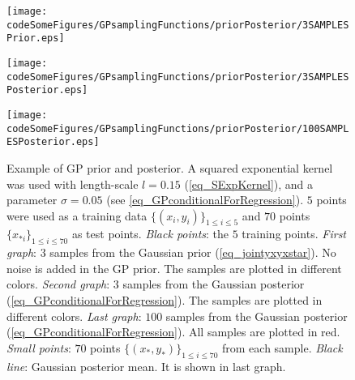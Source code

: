\begin{figure}[!htbp] 
  \centering
    \texttt{[image: codeSomeFigures/GPsamplingFunctions/priorPosterior/3SAMPLESPrior.eps]}
    \vspace{5mm}

    \texttt{[image: codeSomeFigures/GPsamplingFunctions/priorPosterior/3SAMPLESPosterior.eps]}
    \vspace{5mm}

    \texttt{[image: codeSomeFigures/GPsamplingFunctions/priorPosterior/100SAMPLESPosterior.eps]}
  \caption[Example of GP prior and posterior]%
{Example of GP prior and posterior. 
  A squared exponential kernel was used with length-scale $l=0.15$ (\ref{eq_SExpKernel}), and a parameter $\sigma = 0.05$ (see \ref{eq_GPconditionalForRegression}). $5$ points were used as a training data $\{ (x_i,y_i) \}_{1 \leq i \leq 5}$ and $70$ points $\{x_{*i}\}_{1 \leq i \leq 70}$ as test points.
  \emph{Black points}: the $5$ training points.
  \emph{First graph}: $3$ samples from the Gaussian prior (\ref{eq_jointyxyxstar}). No noise is added in the GP prior. The samples are plotted in different colors.
  \emph{Second graph}: $3$ samples from the Gaussian posterior (\ref{eq_GPconditionalForRegression}). The samples are plotted in different colors.
  \emph{Last graph}: $100$ samples from the Gaussian posterior (\ref{eq_GPconditionalForRegression}). All samples are plotted in red.
  \emph{Small points}: $70$ points $\{(x_*,y_*)\}_{1 \leq i \leq 70}$ from each sample. 
  \emph{Black line}: Gaussian posterior mean. It is shown in last graph.
}
\label{fig_exampleGP}
\end{figure}

%     
%
%  
%


